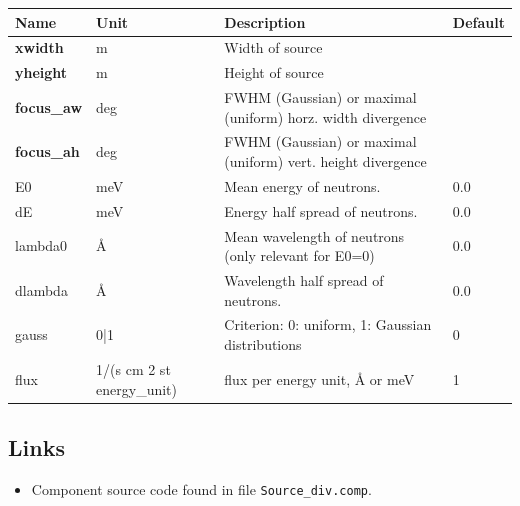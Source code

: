 \begin{longtable}{p{}p{}p{}p{}}
\toprule
\textbf{Name} & \textbf{Unit} & \textbf{Description} & \textbf{Default} \\
\midrule
\endhead
\textbf{xwidth} & m & Width of source &  \\
\textbf{yheight} & m & Height of source &  \\
\textbf{focus\_aw} & deg & FWHM (Gaussian) or maximal (uniform) horz. width divergence &  \\
\textbf{focus\_ah} & deg & FWHM (Gaussian) or maximal (uniform) vert. height divergence &  \\
E0 & meV & Mean energy of neutrons. & 0.0 \\
dE & meV & Energy half spread of neutrons. & 0.0 \\
lambda0 & \AA{} & Mean wavelength of neutrons (only relevant for E0=0) & 0.0 \\
dlambda & \AA{} & Wavelength half spread of neutrons. & 0.0 \\
gauss & 0|1 & Criterion: 0: uniform, 1: Gaussian distributions & 0 \\
flux & 1/(s cm 2 st energy\_unit) & flux per energy unit, \AA{} or meV & 1 \\
\bottomrule
\end{longtable}

\subsection*{Links}
\begin{itemize}
  \item Component source code found in file \texttt{Source\_div.comp}.
\end{itemize}
